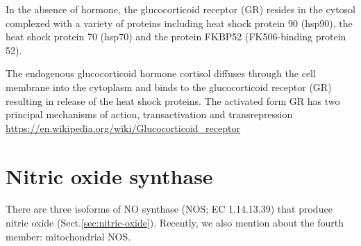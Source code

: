 In the absence of hormone, the glucocorticoid receptor (GR) resides in the
cytosol complexed with a variety of proteins including heat shock protein 90
(hsp90), the heat shock protein 70 (hsp70) and the protein FKBP52 (FK506-binding
protein 52).

The endogenous glucocorticoid hormone cortisol diffuses through the cell
membrane into the cytoplasm and binds to the glucocorticoid receptor (GR)
resulting in release of the heat shock proteins.
The activated form GR has two principal mechanisms of action, transactivation
and transrepression
\url{https://en.wikipedia.org/wiki/Glucocorticoid_receptor}



\section{Nitric oxide synthase}
\label{sec:nitric-oxide-synthase}
\label{sec:NO-synthase}

There are three isoforms of NO synthase (NOS; EC 1.14.13.39) that produce nitric
oxide (Sect.\ref{sec:nitric-oxide}).  Recently, we also mention about the fourth
member: mitochondrial NOS.


